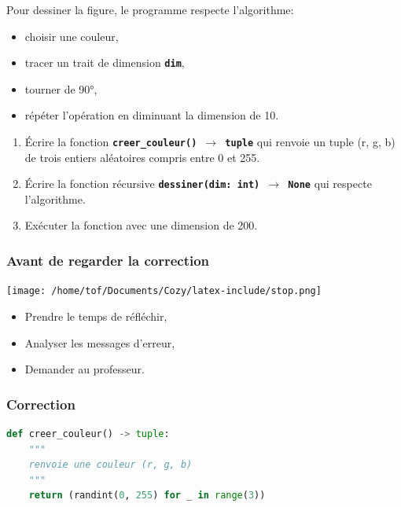 \documentclass[svgnames,11pt]{beamer}
\begin{document}
\begin{frame}
    \frametitle{}
Pour dessiner la figure, le programme respecte l'algorithme:
\begin{itemize}
    \item choisir une couleur,
    \item tracer un trait de dimension \textbf{\texttt{dim}},
    \item tourner de 90°,
    \item répéter l'opération en diminuant la dimension de 10.
\end{itemize}
    \begin{activite}
    \begin{enumerate}
        \item Écrire la fonction \textbf{\texttt{creer\_couleur() $\rightarrow$ tuple}} qui renvoie un tuple (r, g, b) de trois entiers aléatoires compris entre 0 et 255.
        \item Écrire la fonction récursive \textbf{\texttt{dessiner(dim: int) $\rightarrow$ None}} qui respecte l'algorithme.
        \item Exécuter la fonction avec une dimension de 200.
    \end{enumerate}
    \end{activite}

\end{frame}
\begin{frame}
    \frametitle{Avant de regarder la correction}
\begin{center}
    \centering
    \texttt{[image: /home/tof/Documents/Cozy/latex-include/stop.png]}
    \end{center}
{\Large
    \begin{itemize}
        \item Prendre le temps de réfléchir,
        \item Analyser les messages d'erreur,
        \item Demander au professeur.
    \end{itemize}
}
\end{frame}
\begin{frame}[fragile]
    \frametitle{Correction}

    \begin{center}
    \begin{lstlisting}[language=Python , basicstyle=\ttfamily\small, xleftmargin=2em, xrightmargin=1em]
def creer_couleur() -> tuple:
    """
    renvoie une couleur (r, g, b)
    """
    return (randint(0, 255) for _ in range(3))
\end{lstlisting}
    \label{CODE}
    \end{center}

\end{frame}
\end{document}
